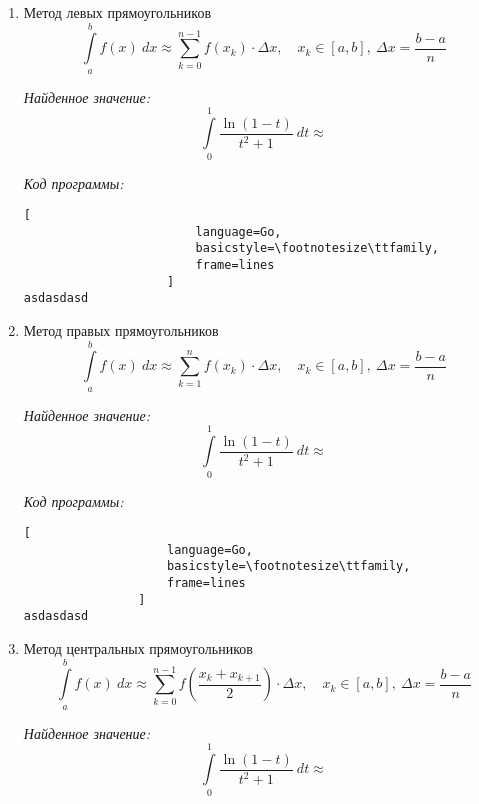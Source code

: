 \documentclass[14pt, a4paper, titlepage, fleqn]{extarticle}
\begin{document}
            \begin{enumerate}
                \item Метод левых прямоугольников
                    \[
                        \int\limits_a^b f(x) ~ dx \approx
                        \sum_{k=0}^{n-1} f\left( x_k \right) \cdot \Delta x,
                        \quad x_k \in [a, b], ~ \Delta x = \frac{b-a}{n}    
                    \]

                    \textit{Найденное значение:}
                    \[
                        \int\limits_0^1 \frac{\ln(1-t)}{t^2+1} ~ dt \approx
                    \]

                    \textit{Код программы:}
                    \begin{lstlisting}[
                        language=Go,
                        basicstyle=\footnotesize\ttfamily,
                        frame=lines
                    ]
asdasdasd
                    \end{lstlisting}


                \item Метод правых прямоугольников
                \[
                    \int\limits_a^b f(x) ~ dx \approx
                    \sum_{k=1}^{n} f\left( x_k \right) \cdot \Delta x,
                    \quad x_k \in [a, b], ~ \Delta x = \frac{b-a}{n}    
                \]

                \textit{Найденное значение:}
                \[
                    \int\limits_0^1 \frac{\ln(1-t)}{t^2+1} ~ dt \approx
                \]

                \textit{Код программы:}
                \begin{lstlisting}[
                    language=Go,
                    basicstyle=\footnotesize\ttfamily,
                    frame=lines
                ]
asdasdasd
                \end{lstlisting}
                
                \item Метод центральных прямоугольников
                \[
                    \int\limits_a^b f(x) ~ dx \approx
                    \sum_{k=0}^{n-1} f\left( \frac{x_k + x_{k+1}}{2}\right)\cdot
                    \Delta x,
                    \quad x_k \in [a, b], ~ \Delta x = \frac{b-a}{n}    
                \]

                \textit{Найденное значение:}
                \[
                    \int\limits_0^1 \frac{\ln(1-t)}{t^2+1} ~ dt \approx
                \]


\end{enumerate}
\end{document}
